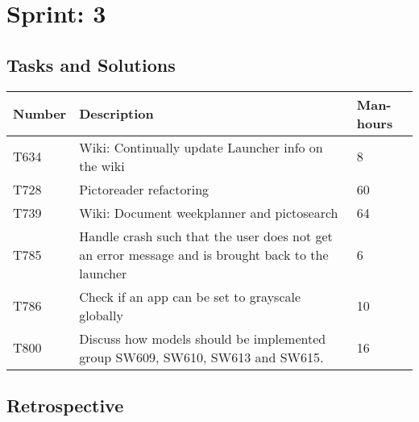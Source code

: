 \chapter{Sprint: 3}

\section{Tasks and Solutions}
\begin{table}[H]
\begin{centering}
\begin{tabular}{|l|p{9cm}|l|}
\hline
Number 	& Description & Man-hours \\ \hline
T634   	& Wiki: Continually update Launcher info on the wiki & 8\\\hline
T728  	& Pictoreader refactoring & 60 \\ \hline
T739	& Wiki: Document weekplanner and pictosearch & 64\\ \hline
T785	& Handle crash such that the user does not get an error message and is
		  brought back to the launcher & 6\\ \hline
T786 	& Check if an app can be set to grayscale globally & 10\\ \hline
T800 	& Discuss how models should be implemented group SW609, SW610, SW613 and
		  SW615.& 16\\ \hline
\end{tabular}
\end{centering}
\end{table}


\section{Retrospective}
